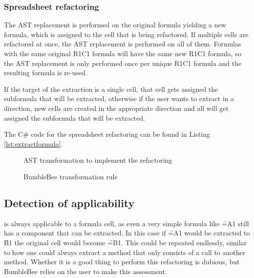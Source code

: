 \subsubsection{Spreadsheet refactoring}

The AST replacement is performed on the original formula yielding a new formula, which is assigned to the cell that is being refactored.
If multiple cells are refactored at once, the AST replacement is performed on all of them.
Formulas with the same original R1C1 formula will have the same new R1C1 formula, so the AST replacement is only performed once per unique R1C1 formula and the resulting formula is re-used.

If the target of the extraction is a single cell, that cell gets assigned the subformula that will be extracted, otherwise if the user wants to extract in a direction, new cells are created in the appropriate direction and all will get assigned the subformula that will be extracted.

The C\# code for the spreadsheet refactoring can be found in Listing \ref{lst:extractformula}.

\begin{figure}
	\centering
	
	\caption{AST transformation to implement the  refactoring}
	\label{fig:extractformulaASTtransformations}
\end{figure}

\begin{figure}
	\centering
	
	\caption{BumbleBee transformation rule}
	\label{fig:bbv1transformationrule}
\end{figure}

\newpage

\subsection{Detection of applicability}

 is always applicable to a formula cell, as even a very simple formula like \f{=A1} still has a component that can be extracted.
In this case if \f{=A1} would be extracted to \f{B1} the original cell would become \f{=B1}.
This could be repeated endlessly, similar to how one could always extract a method that only consists of a call to another method.
Whether it is a good thing to perform this refactoring is dubious, but BumbleBee relies on the user to make this assessment.

